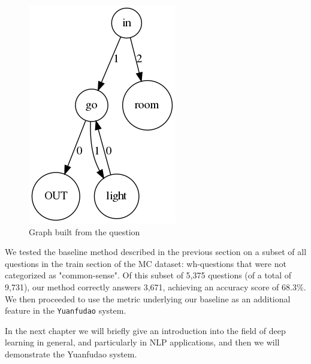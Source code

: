 \begin{figure}
	\centering
	\includegraphics[scale=0.3]{figures/compdef}
	\caption{Graph built from the question}
	\label{fig:merge3}
\end{figure}

We tested the baseline method described in the previous section on a
subset of all questions in the train section of the MC dataset:
wh-questions that were not
categorized as "common-sense". Of this subset of 5,375 questions (of a
total of 9,731), our
method correctly answers 3,671, achieving an accuracy score of $68.3\%$.
We then proceeded to use the metric underlying our baseline as an
additional feature in the \texttt{Yuanfudao} system. 

In the next chapter we will briefly give an introduction into the field of deep learning in general, and particularly in NLP applications, and then we will demonstrate the Yuanfudao system.
